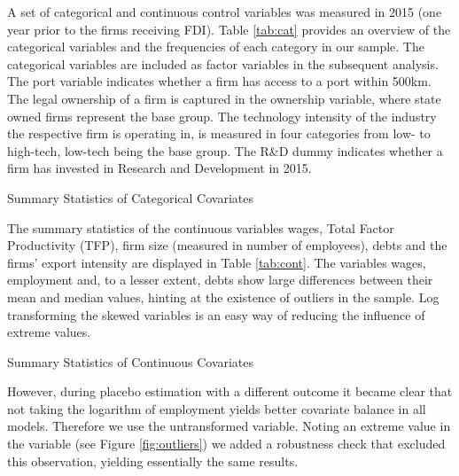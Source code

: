 \documentclass[a4paper,11pt]{scrartcl}
\begin{document}
A set of categorical and continuous control variables was measured in 2015 (one year prior to the firms receiving FDI). Table \ref{tab:cat} provides an overview of the categorical variables and the frequencies of each category in our sample. The categorical variables are included as factor variables in the subsequent analysis. The port variable indicates whether a firm has access to a port within 500km. The legal ownership of a firm is captured in the ownership variable, where state owned firms represent the base group. The technology intensity of the industry the respective firm is operating in, is measured in four categories from low- to high-tech, low-tech being the base group. The R\&D dummy indicates whether a firm has invested in Research and Development in 2015. \\

\begin{table}[h]
	\centering
	\caption{Summary Statistics of Categorical Covariates} 
	
	\label{tab:cat}	
\end{table}

The summary statistics of the continuous variables wages, Total Factor Productivity (TFP), firm size (measured in number of employees), debts and the firms' export intensity are displayed in Table \ref{tab:cont}. The variables wages, employment and, to a lesser extent, debts show large differences between their mean and median values, hinting at the existence of outliers in the sample. Log transforming the skewed variables is an easy way of reducing the influence of extreme values. 

\begin{table}[h]
	\centering
	\caption{Summary Statistics of Continuous Covariates} 
	
	\label{tab:cont}
\end{table}

However, during placebo estimation with a different outcome it became clear that not taking the logarithm of employment yields better covariate balance in all models. Therefore we use the untransformed variable. Noting an extreme value in the variable (see Figure \ref{fig:outliers}) we added a robustness check that excluded this observation, yielding essentially the same results. 
 
\end{document}
